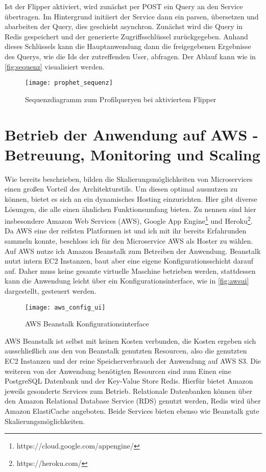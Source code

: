 Ist der Flipper aktiviert, wird zunächst per POST ein Query an den Service übertragen. Im Hintergrund initiiert der Service dann ein parsen, übersetzen und abarbeiten der Query, dies geschieht asynchron. Zunächst wird die Query in Redis gespeichert und der generierte Zugriffsschlüssel zurückgegeben.
Anhand dieses Schlüssels kann die Hauptanwendung dann die freigegebenen Ergebnisse des Querys, wie die Ids der zutreffenden User, abfragen. Der Ablauf kann wie in \autoref{fig:sequenz} visualisiert werden.

\begin{figure}[!ht]
    \centering
    \caption{Sequenzdiagramm zum Profilqueryen bei aktiviertem Flipper}
    \label{fig:sequenz}
    \texttt{[image: prophet\_sequenz]}
\end{figure}

\section{Betrieb der Anwendung auf AWS - Betreuung, Monitoring und Scaling}
Wie bereits beschrieben, bilden die Skalierungsmöglichkeiten von Microservices einen großen Vorteil des Architekturstils. Um diesen optimal ausnutzen zu können, bietet es sich an ein dynamisches Hosting einzurichten. Hier gibt diverse Lösungen, die alle einen ähnlichen Funktionsumfang bieten. Zu nennen sind hier insbesondere Amazon Web Services (AWS), Google App Engine\footnote{https://cloud.google.com/appengine/} und Heroku\footnote{https://heroku.com/}. Da AWS eine der reifsten Platformen ist und ich mit ihr bereits Erfahrunden sammeln konnte, beschloss ich für den Microservice AWS als Hoster zu wählen.
Auf AWS nutze ich Amazon Beanstalk zum Betreiben der Anwendung. Beanstalk nutzt intern EC2 Instanzen, baut aber eine eigene Konfigurationsschicht darauf auf. Daher muss keine gesamte virtuelle Maschine betrieben werden, stattdessen kann die Anwendung leicht über ein Konfigurationsinterface, wie in \autoref{fig:awsui} dargestellt, gesteuert werden.

\begin{figure}[!ht]
    \centering
    \caption{AWS Beanstalk Konfigurationsinterface}
    \label{fig:awsui}
    \texttt{[image: aws\_config\_ui]}
\end{figure}
AWS Beanstalk ist selbst mit keinen Kosten verbunden, die Kosten ergeben sich ausschließlich aus den von Beanstalk genutzten Resourcen, also die genutzten EC2 Instanzen und der reine Speicherverbrauch der Anwendung auf AWS S3. Die weiteren von der Anwendung benötigten Resourcen sind zum Einen eine PostgreSQL Datenbank und der Key-Value Store Redis. Hierfür bietet Amazon jeweils gesonderte Services zum Betrieb. Relationale Datenbanken können über den Amazon Relational Database Service (RDS) genutzt werden, Redis wird über Amazon ElastiCache angeboten. Beide Services bieten ebenso wie Beanstalk gute Skalierungsmöglichkeiten.

